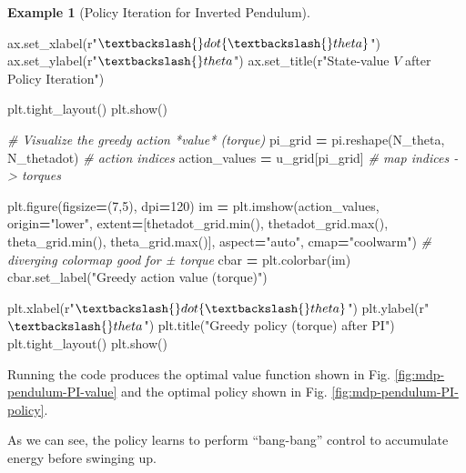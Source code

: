 \documentclass[
]{book}
\newenvironment{Shaded}{\begin{snugshade}}{\end{snugshade}}
\newcommand{\BuiltInTok}[1]{#1}
\newcommand{\CommentTok}[1]{\textcolor[rgb]{0.56,0.35,0.01}{\textit{#1}}}
\newcommand{\DecValTok}[1]{\textcolor[rgb]{0.00,0.00,0.81}{#1}}
\newcommand{\NormalTok}[1]{#1}
\newcommand{\OperatorTok}[1]{\textcolor[rgb]{0.81,0.36,0.00}{\textbf{#1}}}
\newcommand{\StringTok}[1]{\textcolor[rgb]{0.31,0.60,0.02}{#1}}
\newcommand{\VerbatimStringTok}[1]{\textcolor[rgb]{0.31,0.60,0.02}{#1}}
\theoremstyle{definition}
\theoremstyle{definition}
\newtheorem{example}{Example}[chapter]
\theoremstyle{definition}
\theoremstyle{definition}
\theoremstyle{remark}
\begin{document}
\begin{example}[Policy Iteration for Inverted Pendulum]
\begin{Shaded}
\begin{Highlighting}[]
\NormalTok{ax.set\_xlabel(}\VerbatimStringTok{r"$\textbackslash{}dot\{\textbackslash{}theta\}$"}\NormalTok{)}
\NormalTok{ax.set\_ylabel(}\VerbatimStringTok{r"$\textbackslash{}theta$"}\NormalTok{)}
\NormalTok{ax.set\_title(}\VerbatimStringTok{r"State{-}value $V$ after Policy Iteration"}\NormalTok{)}

\NormalTok{plt.tight\_layout()}
\NormalTok{plt.show()}

\CommentTok{\# Visualize the greedy action *value* (torque)}
\NormalTok{pi\_grid }\OperatorTok{=}\NormalTok{ pi.reshape(N\_theta, N\_thetadot)          }\CommentTok{\# action indices}
\NormalTok{action\_values }\OperatorTok{=}\NormalTok{ u\_grid[pi\_grid]                    }\CommentTok{\# map indices {-}\textgreater{} torques}

\NormalTok{plt.figure(figsize}\OperatorTok{=}\NormalTok{(}\DecValTok{7}\NormalTok{,}\DecValTok{5}\NormalTok{), dpi}\OperatorTok{=}\DecValTok{120}\NormalTok{)}
\NormalTok{im }\OperatorTok{=}\NormalTok{ plt.imshow(action\_values,}
\NormalTok{           origin}\OperatorTok{=}\StringTok{"lower"}\NormalTok{,}
\NormalTok{           extent}\OperatorTok{=}\NormalTok{[thetadot\_grid.}\BuiltInTok{min}\NormalTok{(), thetadot\_grid.}\BuiltInTok{max}\NormalTok{(),}
\NormalTok{                   theta\_grid.}\BuiltInTok{min}\NormalTok{(), theta\_grid.}\BuiltInTok{max}\NormalTok{()],}
\NormalTok{           aspect}\OperatorTok{=}\StringTok{"auto"}\NormalTok{, cmap}\OperatorTok{=}\StringTok{"coolwarm"}\NormalTok{)         }\CommentTok{\# diverging colormap good for ± torque}
\NormalTok{cbar }\OperatorTok{=}\NormalTok{ plt.colorbar(im)}
\NormalTok{cbar.set\_label(}\StringTok{"Greedy action value (torque)"}\NormalTok{)}

\NormalTok{plt.xlabel(}\VerbatimStringTok{r"$\textbackslash{}dot\{\textbackslash{}theta\}$"}\NormalTok{)}
\NormalTok{plt.ylabel(}\VerbatimStringTok{r"$\textbackslash{}theta$"}\NormalTok{)}
\NormalTok{plt.title(}\StringTok{"Greedy policy (torque) after PI"}\NormalTok{)}
\NormalTok{plt.tight\_layout()}
\NormalTok{plt.show()}
\end{Highlighting}
\end{Shaded}

Running the code produces the optimal value function shown in Fig. \ref{fig:mdp-pendulum-PI-value} and the optimal policy shown in Fig. \ref{fig:mdp-pendulum-PI-policy}.

As we can see, the policy learns to perform ``bang-bang'' control to accumulate energy before swinging up.


\end{example}
\end{document}
